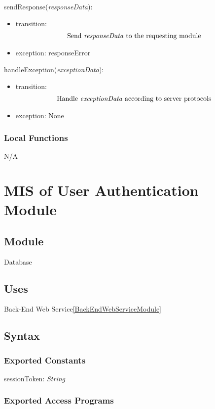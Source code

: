 \documentclass[12pt, titlepage]{article}
\begin{document}
\noindent sendResponse(\textit{responseData}):
\begin{itemize}
\item transition: 
\begin{align*}
\text{Send \textit{responseData} to the requesting module}
\end{align*}

\item exception: responseError
\end{itemize}

\noindent handleException(\textit{exceptionData}):
\begin{itemize}
\item transition: 
\begin{align*}
\text{Handle \textit{exceptionData} according to server protocols}
\end{align*}

\item exception: None
\end{itemize}

\subsubsection{Local Functions}
N/A


\newpage
\section{MIS of User Authentication Module} \label{UserAuthenticationModule}

\subsection{Module}
Database

\subsection{Uses}
Back-End Web Service\ref{BackEndWebServiceModule}
\
\subsection{Syntax}

\subsubsection{Exported Constants}
sessionToken: \textit{String}

\subsubsection{Exported Access Programs}
\end{document}
